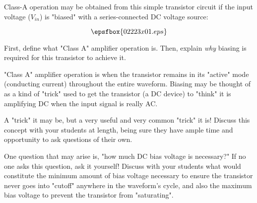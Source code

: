 

Class-A operation may be obtained from this simple transistor circuit if the input voltage ($V_{in}$) is "biased" with a series-connected DC voltage source:

$$\epsfbox{02223x01.eps}$$

First, define what "Class A" amplifier operation is.  Then, explain {\it why} biasing is required for this transistor to achieve it.







"Class A" amplifier operation is when the transistor remains in its "active" mode (conducting current) throughout the entire waveform.  Biasing may be thought of as a kind of "trick" used to get the transistor (a DC device) to "think" it is amplifying DC when the input signal is really AC.







A "trick" it may be, but a very useful and very common "trick" it is!  Discuss this concept with your students at length, being sure they have ample time and opportunity to ask questions of their own.  

One question that may arise is, "how much DC bias voltage is necessary?"  If no one asks this question, ask it yourself!  Discuss with your students what would constitute the minimum amount of bias voltage necessary to ensure the transistor never goes into "cutoff" anywhere in the waveform's cycle, and also the maximum bias voltage to prevent the transistor from "saturating".




